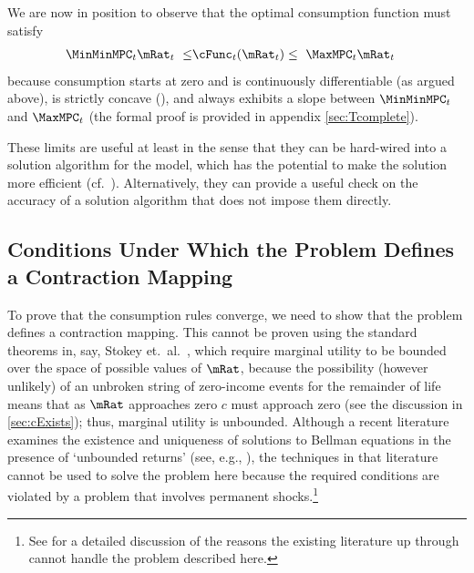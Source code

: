 \documentclass[BufferStockTheory]{subfiles}
\begin{document}
We are now in position to observe that the optimal consumption function must satisfy
\begin{align}
  \MinMinMPC_{t} \mRat_{t} ~ \leq &   \cFunc_{t}(\mRat_{t})  \leq  ~ \MaxMPC_{t} \mRat_{t} \label{eq:cBounds}
\end{align}
because consumption starts at zero and is continuously
differentiable (as argued above), is strictly
concave (\cite{ckConcavity}), and always exhibits a
slope between $\MinMinMPC_{t}$ and $\MaxMPC_{t}$ (the formal proof is provided in appendix \ref{sec:Tcomplete}).

These limits are useful at least in the sense that they can be hard-wired into a solution algorithm for the model, which has the potential to make the solution more efficient (cf.\ \cite{cctwMoM}).  Alternatively, they can provide a useful check on the accuracy of a solution algorithm that does not impose them directly.

\hypertarget{Conditions-Under-Which-the-Problem-Defines-a-Contraction-Mapping}{}
\subsection{Conditions Under Which the Problem Defines a Contraction Mapping}

\label{subsec:contraction}

To prove that the consumption rules converge, we need to show that the
problem defines a contraction mapping. This cannot be proven using the
standard theorems in, say, Stokey et.\ al.~\citeyearpar{slpMethods},
which require marginal utility to be bounded over the space of
possible values of $\mRat$, because the possibility (however unlikely)
of an unbroken string of zero-income events for the remainder of life
means that as $\mRat$ approaches zero $c$ must approach zero (see the
discussion in \ref{sec:cExists}); thus, marginal utility is unbounded.
Although a recent literature examines the existence and uniqueness 
of solutions to Bellman equations in the presence of `unbounded returns' (see, e.g.,
\cite{mnUnique}), the techniques in that literature
cannot be used to solve the problem here because the required conditions 
are violated by a problem that involves permanent shocks.\footnote{See \cite{yaoNote}
  for a detailed discussion of the reasons the existing literature up through \cite{mnUnique} cannot handle 
  the problem described here.}
\end{document}
